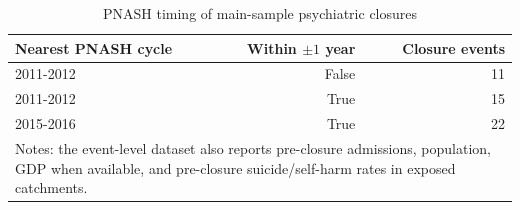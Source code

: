 \begin{table}[!htbp]\centering
\caption{PNASH timing of main-sample psychiatric closures}
\label{tab:event-level-pnash}
\small
\begin{tabular}{lrr}
\toprule
Nearest PNASH cycle & Within $\pm 1$ year & Closure events \\
\midrule
2011-2012 & False & 11 \\
2011-2012 & True & 15 \\
2015-2016 & True & 22 \\
\bottomrule
\multicolumn{3}{p{0.76\textwidth}}{\footnotesize Notes: the event-level dataset also reports pre-closure admissions, population, GDP when available, and pre-closure suicide/self-harm rates in exposed catchments.}\\
\end{tabular}
\end{table}
